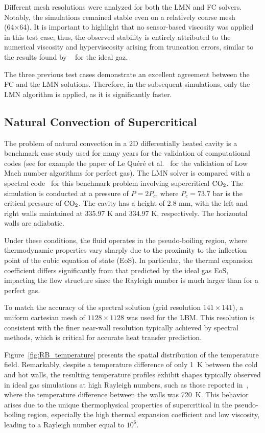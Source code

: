 Different mesh resolutions were analyzed for both the LMN and FC solvers.
Notably, the simulations remained stable even on a relatively coarse mesh
(64×64). It is important to highlight that no sensor-based viscosity was applied
in this test case; thus, the observed stability is entirely attributed to the
numerical viscosity and hyperviscosity arising from truncation errors, similar
to the results found by ~\cite{farag2021unified} for the ideal gaz.

The three previous test cases demonstrate an excellent agreement between the FC
and the LMN solutions. Therefore, in the subsequent simulations, only the LMN
algorithm is applied, as it is significantly faster.

\subsection{Natural Convection of Supercritical }

The problem of natural convection in a 2D differentially heated cavity is a
benchmark case study used for many years for the validation of computational
codes (see for example the paper of Le Quéré et al.~\cite{Lequere2005} for the
validation of Low Mach number algorithms for perfect gas). The LMN solver is
compared with a spectral code~\cite{Ameur2013} for this benchmark problem
involving supercritical \(\ce{CO2}\). The simulation is conducted at a pressure
of \(P = 2 P_c\), where \(P_c = 73.7 \) bar is the critical pressure of
$\ce{CO2}$. The cavity has a height of 2.8 mm, with the left and right walls
maintained at 335.97 K and 334.97 K, respectively. The horizontal walls are
adiabatic.

Under these conditions, the fluid operates in the pseudo-boiling region, where
thermodynamic properties vary sharply due to the proximity to the inflection
point of the cubic equation of state (EoS). In particular, the thermal expansion
coefficient differs significantly from that predicted by the ideal gas EoS,
impacting the flow structure since the Rayleigh number is much larger than for a
perfect gas. 

To match the accuracy of the spectral solution (grid resolution \(141 \times
141\)), a uniform cartesian mesh of \(1128 \times 1128\) was used for the LBM.
This resolution is consistent with the finer near-wall resolution typically
achieved by spectral methods, which is critical for accurate heat transfer
prediction.

Figure~\ref{fig:RB_temperature} presents the spatial distribution of the
temperature field. Remarkably, despite a temperature difference of only 1~K
between the cold and hot walls, the resulting temperature profiles exhibit
shapes typically observed in ideal gas simulations at high Rayleigh numbers,
such as those reported in~\cite{wang2022new}, where the temperature difference
between the walls was 720~K. This behavior arises due to the unique
thermophysical properties of supercritical  in the pseudo-boiling
region, especially the high thermal expansion coefficient and low viscosity,
leading to a Rayleigh number equal to $ 10^6$. 

